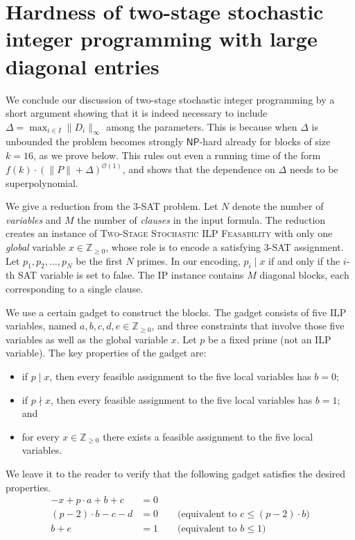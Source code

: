 \documentclass{theoretics}
\renewcommand{\leq}{\leqslant}
\renewcommand{\geq}{\geqslant}
\newcommand{\Z}{\mathbb{Z}}
\newcommand{\Zn}{\Z_{\geq 0}}
\newcommand{\Oh}{{\mathcal{O}}}
\newcommand{\stageFeas}{\textsc{Two-Stage Stochastic ILP Feasability}}
\begin{document}
\section{Hardness of two-stage stochastic integer programming with large diagonal entries}
\label{sec:nphard}

We conclude our discussion of two-stage stochastic integer programming by a short argument showing that it is indeed necessary to include $\Delta=\max_{i\in I} \|D_i\|_\infty$ among the parameters. This is because when $\Delta$ is unbounded the problem becomes strongly $\mathsf{NP}$-hard already for blocks of size $k=16$, as we prove below. This rules out even a running time of the form $f(k) \cdot (\|P\|+ \Delta)^{\Oh(1)}$, and shows that the dependence on $\Delta$ needs to be superpolynomial.

We give a reduction from the 3-SAT problem. Let $N$ denote the number of \emph{variables} and $M$ the number of \emph{clauses} in the input formula. The reduction creates an instance of \stageFeas{} with only one \emph{global} variable $x \in \Zn$, whose role is to encode a satisfying 3-SAT assignment. Let $p_1, p_2, \ldots, p_N$ be the first $N$ primes. In our encoding, $p_i \mid x$ if and only if the $i$-th SAT variable is set to false. The IP instance contains $M$ diagonal blocks, each corresponding to a single clause.

We use a certain gadget to construct the blocks. The gadget consists of five ILP variables, named $a,b,c,d,e\in \Zn$, and three constraints that involve those five variables as well as the global variable $x$. Let $p$ be a fixed prime (not an ILP variable). The key properties of the gadget are:
\begin{itemize}[nosep]
\item if $p \mid x$, then every feasible assignment to the five local variables has $b=0$;
\item if $p \nmid x$,  then every feasible assignment to the five local variables has $b=1$; and
\item for every $x \in \Zn$ there exists a feasible assignment to the five local variables.
\end{itemize}
We leave it to the reader to verify that the following gadget satisfies the desired properties.
\begin{align*}
-x + p \cdot a + b + c & = 0 \\
(p-2) \cdot b - c - d &= 0 \qquad \text{(equivalent to $c \leq (p-2) \cdot b$)} \\
b + e &= 1 \qquad \text{(equivalent to $b \leq 1$)}
\end{align*}
\end{document}
